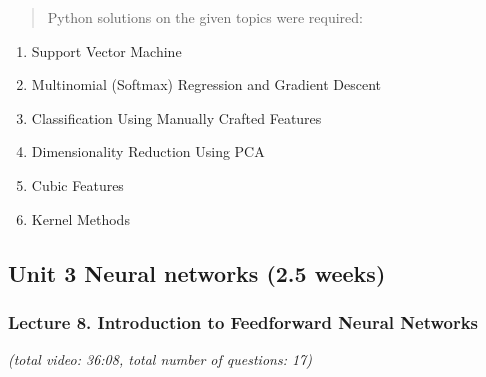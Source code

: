 \documentclass[]{article}
\providecommand{\tightlist}{%
  \setlength{\itemsep}{0pt}\setlength{\parskip}{0pt}}
\begin{document}
\begin{quote}
Python solutions on the given topics were required:
\end{quote}

\begin{enumerate}
\def\labelenumi{\arabic{enumi}.}
\tightlist
\item
  Support Vector Machine
\item
  Multinomial (Softmax) Regression and Gradient Descent
\item
  Classification Using Manually Crafted Features
\item
  Dimensionality Reduction Using PCA
\item
  Cubic Features
\item
  Kernel Methods
\end{enumerate}

\hypertarget{unit-3-neural-networks-2.5-weeks}{%
\subsection{Unit 3 Neural networks (2.5
weeks)}\label{unit-3-neural-networks-2.5-weeks}}

\hypertarget{lecture-8.-introduction-to-feedforward-neural-networks}{%
\subsubsection{Lecture 8. Introduction to Feedforward Neural
Networks}\label{lecture-8.-introduction-to-feedforward-neural-networks}}

\emph{(total video: 36:08, total number of questions: 17)}
\end{document}
